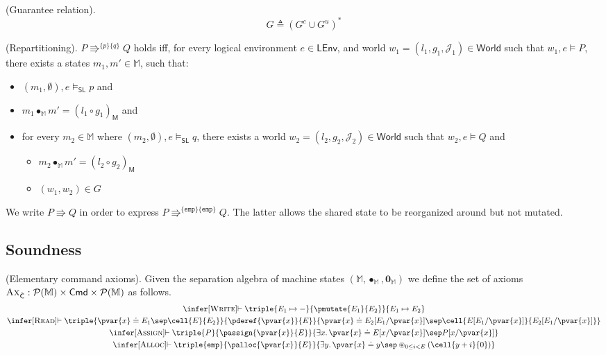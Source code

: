  (Guarantee relation).
\[
	G \triangleq (G^c \cup G^u)^*
\]

 (Repartitioning). $P \Rrightarrow^{\{p\}\{q\}} Q$ holds iff, for every logical environment $e \in \mathsf{LEnv}$, and world $w_1 = (l_1, g_1, \mathcal{J}_1) \in \mathsf{World}$ such that $w_1, e \vDash P$, there exists a states $m_1, m' \in \mathbb{M}$, such that:
\begin{itemize}
\item $(m_1, \emptyset), e \vDash_\mathsf{SL} p$ and
\item $m_1 \bullet_\mathbb{M} m' = (l_1 \circ g_1)_\mathsf{M}$ and
\item for every $m_2 \in \mathbb{M}$ where $(m_2, \emptyset), e \vDash_\mathsf{SL} q$, there exists a world $w_2 = (l_2, g_2, \mathcal{J}_2) \in \mathsf{World}$ such that $w_2, e \vDash Q$ and
	\begin{itemize}
		\item $m_2 \bullet_\mathbb{M} m' = (l_2 \circ g_2)_\mathsf{M}$
		\item $(w_1, w_2) \in G$
	\end{itemize}
\end{itemize}

We write $P \Rrightarrow Q$ in order to express $P \Rrightarrow^{\{\mathtt{emp}\}\{\mathtt{emp}\}}Q$. The latter allows the shared state to be reorganized around but not mutated.

\subsection{Soundness}

\param (Elementary command axioms). Given the separation algebra of machine states $(\mathbb{M}, \bullet_\mathbb{M}, \mathbf{0}_\mathbb{M})$ we define the set of axioms $\textsc{Ax}_{\hat{\mathsf{C}}} : \mathcal{P}(\mathbb{M}) \times \mathsf{Cmd} \times \mathcal{P}(\mathbb{M})$ as follows.
\begin{gather*}
	\infer[\textsc{Write}]
	{
		\vdash
		\triple
			{E_1 \mapsto -}
			{\pmutate{E_1}{E_2}}
			{E_1 \mapsto E_2}
	}
	{}
	\\
	\infer[\textsc{Read}]
	{
		\vdash
		\triple
			{\pvar{x} \doteq E_1 \sep \cell{E}{E_2}}
			{\pderef{\pvar{x}}{E}}
			{\pvar{x} \doteq E_2[E_1/\pvar{x}] \sep \cell{E[E_1/\pvar{x}]}{E_2[E_1/\pvar{x}]}}
	}
	{}
	\\
	\infer[\textsc{Assign}]
	{
		\vdash
		\triple
			{P}
			{\passign{\pvar{x}}{E}}
			{\exists x \ldotp \pvar{x} \doteq E[x/\pvar{x}] \sep P[x/\pvar{x}]}	
	}
	{}
	\\
	\infer[\textsc{Alloc}]
	{
		\vdash
		\triple
			{\mathtt{emp}}
			{\palloc{\pvar{x}}{E}}
			{\exists y \ldotp \pvar{x} \doteq y \sep \circledast_{0 \leq i < E} \left(\cell{y + i}{0}\right)}
	}
	{}
\end{gather*}

